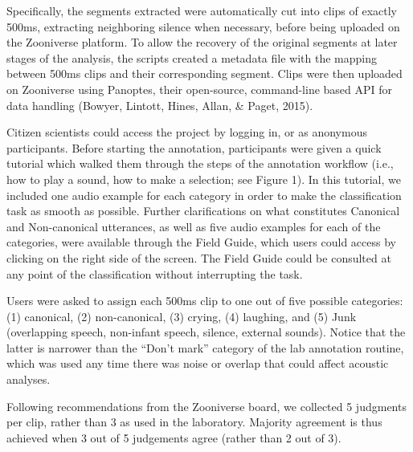 \documentclass[english,,man,floatsintext]{apa6}
\begin{document}
Specifically, the segments extracted were automatically cut into clips of exactly 500ms, extracting neighboring silence when necessary, before being uploaded on the Zooniverse platform. To allow the recovery of the original segments at later stages of the analysis, the scripts created a metadata file with the mapping between 500ms clips and their corresponding segment. Clips were then uploaded on Zooniverse using Panoptes, their open-source, command-line based API for data handling (Bowyer, Lintott, Hines, Allan, \& Paget, 2015).

Citizen scientists could access the project by logging in, or as anonymous participants. Before starting the annotation, participants were given a quick tutorial which walked them through the steps of the annotation workflow (i.e., how to play a sound, how to make a selection; see Figure 1). In this tutorial, we included one audio example for each category in order to make the classification task as smooth as possible. Further clarifications on what constitutes Canonical and Non-canonical utterances, as well as five audio examples for each of the categories, were available through the Field Guide, which users could access by clicking on the right side of the screen. The Field Guide could be consulted at any point of the classification without interrupting the task.

Users were asked to assign each 500ms clip to one out of five possible categories: (1) canonical, (2) non-canonical, (3) crying, (4) laughing, and (5) Junk (overlapping speech, non-infant speech, silence, external sounds). Notice that the latter is narrower than the \enquote{Don't mark} category of the lab annotation routine, which was used any time there was noise or overlap that could affect acoustic analyses.

Following recommendations from the Zooniverse board, we collected 5 judgments per clip, rather than 3 as used in the laboratory. Majority agreement is thus achieved when 3 out of 5 judgements agree (rather than 2 out of 3).
\end{document}
